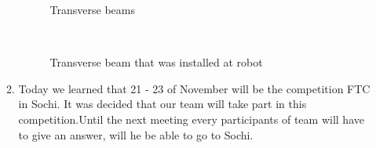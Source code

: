 \begin{enumerate}
\begin{enumerate}
      \begin{figure}[H]
      	\begin{minipage}[h]{0.47\linewidth}
      		\caption{Transverse beams}  
      	\end{minipage}
      	\hfill
      	\begin{minipage}[h]{0.47\linewidth}
      		\caption{Transverse beam that was installed at robot}
      	\end{minipage}
      \end{figure}
      
      \item Today we learned that 21 - 23 of November will be the competition FTC in Sochi. It was decided that our team will take part in this competition.Until the next meeting every participants of team  will have to give an answer, will he be able to go to Sochi.
      

\end{enumerate}
\end{enumerate}

